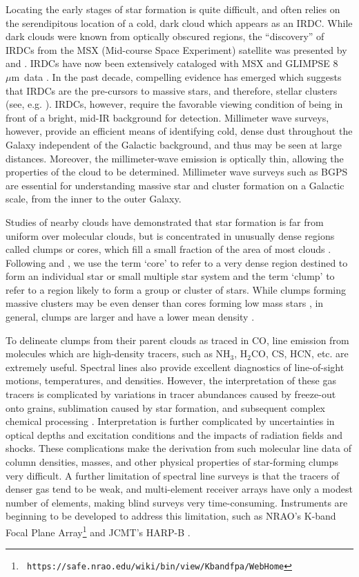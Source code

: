 \documentclass[12pt,preprint]{aastex}
\newcommand{\ammonia}{\mbox{{\rm NH}$_3$}}
\newcommand{\form}{H$_2$CO}
\newcommand{\mum}{\ensuremath{\mu \mathrm{m}}}
\begin{document}
Locating the early stages of star formation is quite difficult, and
often relies on the serendipitous location of a cold, dark cloud which
appears as an IRDC.  While dark clouds were known from optically
obscured regions, the ``discovery'' of IRDCs from the MSX (Mid-course
Space Experiment) satellite was presented by \citet{egan98} and
\citet{carey98}.  IRDCs have now been extensively cataloged with MSX
\citep{simon06a} and GLIMPSE 8 \mum\ data \citep{peretto09}.  In the
past decade, compelling evidence has emerged which suggests that IRDCs
are the pre-cursors to massive stars, and therefore, stellar clusters
(see, e.g. \citet{rathborne06,rathborne08}).  IRDCs, however, require the
favorable viewing condition of being in front of a bright, mid-IR
background for detection.  Millimeter wave surveys, however, provide
an efficient means of identifying cold, dense dust throughout the
Galaxy independent of the Galactic background, and thus may be seen at
large distances.  Moreover, the millimeter-wave emission is optically
thin, allowing the properties of the cloud to be determined.
Millimeter wave surveys such as BGPS are essential for understanding
massive star and cluster formation on a Galactic scale, from the inner
to the outer Galaxy.

Studies of nearby clouds have demonstrated that star formation is far
from uniform over molecular clouds, but is concentrated in unusually
dense regions called clumps or cores, which fill a small fraction of
the area of most clouds \citep{lada91,enoch07,evans09}.  Following
\citet{williams00} and \citet{mckee07}, we use the term `core' to
refer to a very dense region destined to form an individual star or
small multiple star system and the term `clump' to refer to a region
likely to form a group or cluster of stars. While clumps forming
massive clusters may be even denser than cores forming low mass stars
\citep{mueller02}, in general, clumps are larger and have a lower mean
density \citep{mckee07}.

To delineate clumps from their parent clouds as traced in CO, line
emission from molecules which are high-density tracers, such as
\ammonia, \form, CS, HCN, etc. are extremely useful.  Spectral lines
also provide excellent diagnostics of line-of-sight motions,
temperatures, and densities.  However, the interpretation of these gas
tracers is complicated by variations in tracer abundances caused by
freeze-out onto grains, sublimation caused by star formation, and
subsequent complex chemical processing
\citep{vandishoeck98}. Interpretation is further complicated by
uncertainties in optical depths and excitation conditions and the
impacts of radiation fields and shocks. These complications make the
derivation from such molecular line data of column densities, masses,
and other physical properties of star-forming clumps very difficult.
A further limitation of spectral line surveys is that the tracers of
denser gas tend to be weak, and multi-element receiver arrays have only
a modest number of elements, making blind surveys very time-consuming.
Instruments are beginning to be developed to address this limitation,
such as NRAO's K-band Focal Plane Array\footnote{\tt
https://safe.nrao.edu/wiki/bin/view/Kbandfpa/WebHome} and JCMT's
HARP-B \citep{buckle09}.
\end{document}
